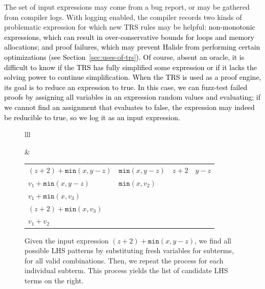 \documentclass[acmsmall]{acmart}\settopmatter{}
\newcommand{\convexpath}[2]{
[   
    create hullnodes/.code={
        \global\edef\namelist{#1}
        \foreach [count=\counter] \nodename in \namelist {
            \global\edef\numberofnodes{\counter}
            \node at (\nodename) [draw=none,name=hullnode\counter] {};
        }
        \node at (hullnode\numberofnodes) [name=hullnode0,draw=none] {};
        \pgfmathtruncatemacro\lastnumber{\numberofnodes+1}
        \node at (hullnode1) [name=hullnode\lastnumber,draw=none] {};
    },
    create hullnodes
]
($(hullnode1)!#2!-90:(hullnode0)$)
\foreach [
    evaluate=\currentnode as \previousnode using \currentnode-1,
    evaluate=\currentnode as \nextnode using \currentnode+1
    ] \currentnode in {1,...,\numberofnodes} {
  let
    \p1 = ($(hullnode\currentnode)!#2!-90:(hullnode\previousnode)$),
    \p2 = ($(hullnode\currentnode)!#2!90:(hullnode\nextnode)$),
    \p3 = ($(\p1) - (hullnode\currentnode)$),
    \n1 = {atan2(\y3,\x3)},
    \p4 = ($(\p2) - (hullnode\currentnode)$),
    \n2 = {atan2(\y4,\x4)},
    \n{delta} = {-Mod(\n1-\n2,360)}
  in 
    {-- (\p1) arc[start angle=\n1, delta angle=\n{delta}, radius=#2] -- (\p2)}
}
-- cycle
}
\newcommand{\modified}[1]{\textcolor{black}{{#1}}}
\newcommand{\hmin}[0]{\texttt{min}}
\begin{document}
The set of input expressions may come from a bug report, or may be gathered from compiler logs. With logging enabled, the compiler records two
kinds of problematic expression for which new TRS rules may be helpful:
\modified{non-monotonic expressions, which can result in over-conservative
bounds for loops and memory allocations; and proof failures,
which may prevent Halide from performing certain optimizations
(see Section~\ref{sec:uses-of-trs}). 
Of course, absent an oracle, it is difficult to know if the TRS has fully simplified 
some expression or if it lacks the solving power to continue simplification. 
When the TRS is used as a proof engine, its goal is to reduce an expression to true.
In this case, we can fuzz-test failed proofs by assigning all variables in an expression
random values and evaluating; if we cannot find an assignment that evaluates to false,
the expression may indeed be reducible to true, so we log it as an input expression.}


\begin{figure}
\begin{tabular}{lll}
\begin{tikzpicture}[level distance=12mm,baseline=(current bounding box.center)]
\tikzstyle{level 1}=[sibling distance=15mm]
\tikzstyle{level 2}=[sibling distance=8mm]
\tikzstyle{level 3}=[level distance=10mm,sibling distance=5mm]

\node (+) {+}
  child { node (+2) {+}
    child { node (z) {z}  } %
    child { node (2) {2} }}
  child { node (min) {\hmin}
    child { node (x) {x}}
    child { node (-) {-} %
      child {node (y) {y}}
      child {node (z1) {z} } %
    }};


\begin{pgfonlayer}{background}
\fill[red,opacity=0.3] \convexpath{x, min, z1, y}{10pt};
\fill[blue,opacity=0.3] \convexpath{y, -, z1}{10pt};
\fill[green,opacity=0.3] \convexpath{z, +2, 2}{10pt};
\end{pgfonlayer}
\end{tikzpicture} &
\begin{tabular}{llll}
$(z + 2) + \hmin(x, y - z)$ & $\hmin(x, y - z)$ & $z + 2$ & $y - z$ \\
$v_1 + \hmin(x, y - z)$ & $\hmin(x, v_2)$ & & \\
$v_1 + \hmin(x, v_3)$ & & & \\
$(z + 2) + \hmin(x, v_3)$ & & & \\
$v_1 + v_2$ & & &
\end{tabular}
\end{tabular}
\caption{Given the input expression $(z + 2) + \hmin(x, y - z)$, we find all possible 
LHS patterns by substituting fresh variables for subterms, for all valid combinations. Then, we repeat the process for 
each individual subterm. This process yields the list of candidate LHS terms on the right.}
\label{fig:lhspatterns}
\end{figure}
\end{document}
